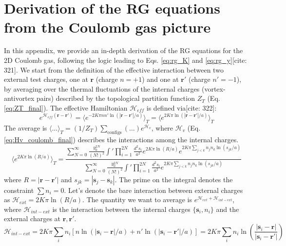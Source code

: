 \documentclass[11pt]{article}
\begin{document}
\appendix
\section{Derivation of the RG equations from the Coulomb gas picture}

In this appendix, we provide an in-depth derivation of the RG equations for the 2D Coulomb gas, following the logic leading to Eqs. \eqref{eq:rg_K} and \eqref{eq:rg_y}[cite: 321]. We start from the definition of the effective interaction between two external test charges, one at $\mathbf{r}$ (charge $n=+1$) and one at $\mathbf{r}'$ (charge $n'=-1$), by averaging over the thermal fluctuations of the internal charges (vortex-antivortex pairs) described by the topological partition function $Z_T$ (Eq. \ref{eq:ZT_final}). The effective Hamiltonian $\mathcal{H}_{eff}$ is defined via[cite: 322]:
\begin{equation}
e^{\mathcal{H}_{eff}(\mathbf{r}-\mathbf{r}')} = \langle e^{-2 K \pi n n' \ln(|\mathbf{r}-\mathbf{r}'|/a)} \rangle_T = \langle e^{2 K \pi \ln(|\mathbf{r}-\mathbf{r}'|/a)} \rangle_T \label{eq:app_Heff_def}
\end{equation}
The average is $\langle \dots \rangle_T = (1/Z_T) \sum_{\text{configs}} (\dots) e^{\mathcal{H}_v}$, where $\mathcal{H}_v$ (Eq. \ref{eq:Hv_coulomb_final}) describes the interactions among the internal charges.
\begin{equation}
\langle e^{2K\pi \ln(R/a)} \rangle_T = \frac{\sum_{N=0}^{\infty} \frac{y_0^{2N}}{(N!)^2} \int' \prod_{i=1}^{2N} \frac{d^2s_i}{a^2} e^{2K\pi \ln(R/a)} e^{2 K \pi \sum_{j<k} n_j n_k \ln(s_{jk}/a)}}{\sum_{N=0}^{\infty} \frac{y_0^{2N}}{(N!)^2} \int' \prod_{i=1}^{2N} \frac{d^2s_i}{a^2} e^{2 K \pi \sum_{j<k} n_j n_k \ln(s_{jk}/a)}} \label{eq:app_avg_expand}
\end{equation}
where $R = |\mathbf{r}-\mathbf{r}'|$ and $s_{jk} = |\mathbf{s}_j - \mathbf{s}_k|$. The prime on the integral denotes the constraint $\sum n_i = 0$. Let's denote the bare interaction between external charges as $\mathcal{H}_{ext} = 2K\pi \ln(R/a)$. The quantity we want to average is $e^{\mathcal{H}_{ext} + \mathcal{H}_{int-ext}}$, where $\mathcal{H}_{int-ext}$ is the interaction between the internal charges $\{ \mathbf{s}_i, n_i \}$ and the external charges at $\mathbf{r}, \mathbf{r}'$.
\begin{equation}
\mathcal{H}_{int-ext} = 2K\pi \sum_i n_i [n \ln(|\mathbf{s}_i - \mathbf{r}|/a) + n' \ln(|\mathbf{s}_i - \mathbf{r}'|/a)] = 2K\pi \sum_i n_i \ln\left(\frac{|\mathbf{s}_i - \mathbf{r}|}{|\mathbf{s}_i - \mathbf{r}'|}\right)
\end{equation}
\end{document}
